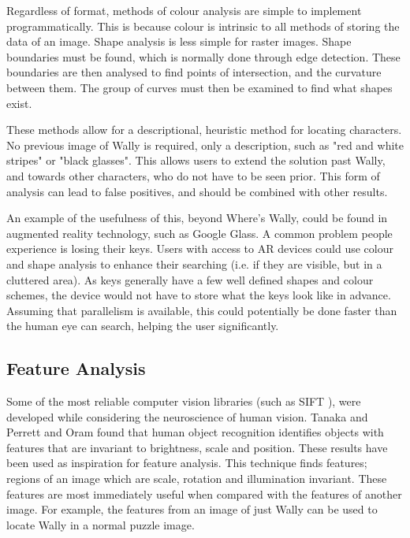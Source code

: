 \documentclass[../main.tex]{subfiles}
\begin{document}
    Regardless of format, methods of colour analysis are simple to implement programmatically.
    This is because colour is intrinsic to all methods of storing the data of an image.
    Shape analysis is less simple for raster images.
    Shape boundaries must be found, which is normally done through edge detection.
    These boundaries are then analysed to find points of intersection, and the curvature between them.
    The group of curves must then be examined to find what shapes exist.

    These methods allow for a descriptional, heuristic method for locating characters.
    No previous image of Wally is required, only a description, such as "red and white stripes" or "black glasses".
    This allows users to extend the solution past Wally, and towards other characters, who do not have to be seen prior.
    This form of analysis can lead to false positives, and should be combined with other results.

    An example of the usefulness of this, beyond Where's Wally, could be found in augmented reality technology, such as Google Glass.
    A common problem people experience is losing their keys.
    Users with access to AR devices could use colour and shape analysis to enhance their searching (i.e. if they are visible, but in a cluttered area).
    As keys generally have a few well defined shapes and colour schemes, the device would not have to store what the keys look like in advance.
    Assuming that parallelism is available, this could potentially be done faster than the human eye can search, helping the user significantly.
    
    \subsection{Feature Analysis}
    Some of the most reliable computer vision libraries (such as SIFT \cite{sift}), were developed while considering the neuroscience of human vision.
    Tanaka\cite{mechobjrecog} and Perrett and Oram\cite{perretthv} found that human object recognition identifies objects with features that are invariant to brightness, scale and position.
    These results have been used as inspiration for feature analysis.
    This technique finds features; regions of an image which are scale, rotation and illumination invariant.
    These features are most immediately useful when compared with the features of another image.
    For example, the features from an image of just Wally can be used to locate Wally in a normal puzzle image.
\end{document}
